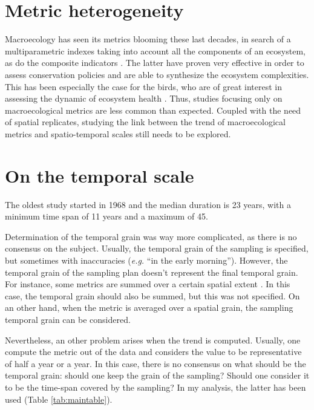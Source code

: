 \documentclass[
  12pt,
  oneside]{report}
\begin{document}
\hypertarget{metric-heterogeneity}{%
\section{Metric heterogeneity}\label{metric-heterogeneity}}

Macroecology has seen its metrics blooming these last decades, in search of a multiparametric indexes taking into account all the components of an ecosystem, as do the composite indicators \autocites[\emph{e.g.} the red list index,][]{butchart_improvements_2007}[biodiversity change indexes,][]{normander_indicator_2012}. The latter have proven very effective in order to assess conservation policies and are able to synthesize the ecosystem complexities. This has been especially the case for the birds, who are of great interest in assessing the dynamic of ecosystem health \autocite{fraixedas_state_2020}. Thus, studies focusing only on macroecological metrics are less common than expected. Coupled with the need of spatial replicates, studying the link between the trend of macroecological metrics and spatio-temporal scales still needs to be explored.

\hypertarget{on-the-temporal-scale}{%
\section{On the temporal scale}\label{on-the-temporal-scale}}

The oldest study started in 1968 and the median duration is 23 years, with a minimum time span of 11 years and a maximum of 45.

Determination of the temporal grain was way more complicated, as there is no consensus on the subject. Usually, the temporal grain of the sampling is specified, but sometimes with inaccuracies (\emph{e.g.} ``in the early morning''). However, the temporal grain of the sampling plan doesn't represent the final temporal grain. For instance, some metrics are summed over a certain spatial extent \autocite[e.g.~summing the species richness over an atlas square, like in][]{van_turnhout_scale-dependent_2007}. In this case, the temporal grain should also be summed, but this was not specified. On an other hand, when the metric is averaged over a spatial grain, the sampling temporal grain can be considered.

Nevertheless, an other problem arises when the trend is computed. Usually, one compute the metric out of the data and considers the value to be representative of half a year or a year. In this case, there is no consensus on what should be the temporal grain: should one keep the grain of the sampling? Should one consider it to be the time-span covered by the sampling? In my analysis, the latter has been used (Table \ref{tab:maintable}).
\end{document}
